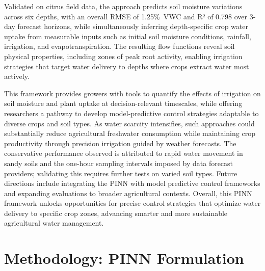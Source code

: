 \documentclass[pdflatex,sn-nature]{sn-jnl}%
\theoremstyle{thmstyleone}%
\theoremstyle{thmstyletwo}%
\theoremstyle{thmstylethree}%
\begin{document}
Validated on citrus field data, the approach predicts soil moisture variations across six depths, with an overall RMSE of 1.25\si{\% VWC} and R² of 0.798 over 3-day forecast horizons, while simultaneously inferring depth-specific crop water uptake from measurable inputs such as initial soil moisture conditions, rainfall, irrigation, and evapotranspiration. The resulting flow functions reveal soil physical properties, including zones of peak root activity, enabling irrigation strategies that target water delivery to depths where crops extract water most actively.

This framework provides growers with tools to quantify the effects of irrigation on soil moisture and plant uptake at decision-relevant timescales, while offering researchers a pathway to develop model-predictive control strategies adaptable to diverse crops and soil types. As water scarcity intensifies, such approaches could substantially reduce agricultural freshwater consumption while maintaining crop productivity through precision irrigation guided by weather forecasts. 
The conservative performance observed is attributed to rapid water movement in sandy soils and the one-hour sampling intervals imposed by data forecast providers; validating this requires further tests on varied soil types. Future directions include integrating the PINN with model predictive control frameworks and expanding evaluations to broader agricultural contexts. Overall, this PINN framework unlocks opportunities for precise control strategies that optimize water delivery to specific crop zones, advancing smarter and more sustainable agricultural water management.


\section{Methodology: PINN Formulation} \label{Methodology}
\end{document}
